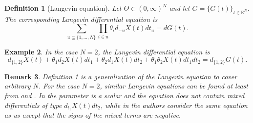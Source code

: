 \documentclass[english, a4paper, 12pt,reqno]{amsart}
\newtheorem{defi}{Definition}[section]
\newtheorem{rem}[defi]{Remark}
\newtheorem{ex}[defi]{Example}
\begin{document}
\begin{defi}[Langevin equation]
\label{defi:langevin}
Let $\Theta \in(0, \infty)^{N}$ and let $G = \{G(t)\}_{t\in\mathbb{R}^N}$. The corresponding Langevin differential equation is
\begin{equation}
\label{langevinequation}
\sum_{u\subseteq\{1,\dots,N\}} \prod _{i\in u}\theta_i d_{-u}X(t) dt_u = dG(t).
\end{equation}

\end{defi}

\begin{ex}
\label{ex:2D}
In the case $N=2$, the Langevin differential equation is
$$d_{\{1,2\}} X(t)+\theta_{1} d_{2} X(t) d t_{1}+\theta_{2} d_{1} X(t) d t_{2}+\theta_1\theta_2 X(t) d t_{1} d t_{2}=d_{\{1,2\}} G(t).$$
\end{ex}

\begin{rem}
\label{rem:novel}
Definition \ref{defi:langevin} is a generalization of the Langevin equation to cover arbitrary $N$. For the case $N=2$, similar Langevin equations can be found at least from \cite{de2012least} and \cite{terdik2005notes}. In \cite{de2012least} the parameter is a scalar and the equation does not contain mixed differentials of type $d_{t_1}X(t)dt_2$, while in \cite{terdik2005notes} the authors consider 
the same equation as us except that the signs of the mixed terms are negative.
\end{rem}
\end{document}
